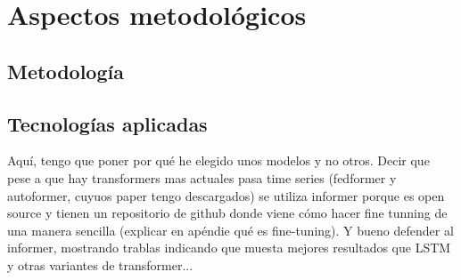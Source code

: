 \pagestyle{plain}

\section{Aspectos metodológicos}

\subsection{Metodología}

\subsection{Tecnologías aplicadas}
\begin{nota}
Aquí, tengo que poner por qué he elegido unos modelos y no otros. Decir que pese a que hay transformers mas actuales pasa time series (fedformer y autoformer, cuyuos paper tengo descargados) se utiliza informer porque es open source y tienen un repositorio de github donde viene cómo hacer fine tunning de una manera sencilla (explicar en apéndie qué es fine-tuning). Y bueno defender al informer, mostrando trablas indicando que muesta mejores resultados que LSTM y otras variantes de transformer...
\end{nota}
\begin{comment}
\begin{itemize}
    \item BI (nada específico. Distintas herramientas en pocas líneas)
        \begin{itemize}
            \item{Gráficos que se vayan a emplear (de barras, de puntos, etc.)}
        \end{itemize}
    \item BA
        \begin{itemize}
            \item Odoo
        \end{itemize}
\end{itemize}
\end{comment}